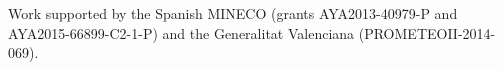\documentclass{aa}
\begin{document}
%



\begin{acknowledgements}
      Work supported by the Spanish MINECO (grants AYA2013-40979-P and AYA2015-66899-C2-1-P) and the Generalitat Valenciana (PROMETEOII-2014-069).
\end{acknowledgements}

%
%



\end{document}

